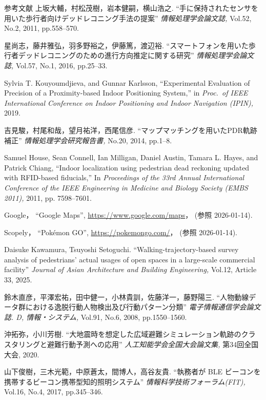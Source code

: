 \begin{thebibliography}{参考文献}
  上坂大輔，村松茂樹，岩本健嗣，横山浩之.
  ``手に保持されたセンサを用いた歩行者向けデッドレコニング手法の提案''
  {\sl 情報処理学会論文誌,}
  Vol.52,
  No.2,
  2011,
  pp.558--570.

  星尚志，藤井雅弘，羽多野裕之，伊藤篤，渡辺裕.
  ``スマートフォンを用いた歩行者デッドレコニングのための進行方向推定に関する研究''
  {\sl 情報処理学会論文誌,}
  Vol.57,
  No.1,
  2016,
  pp.25--33.

  Sylvia T. Kouyoumdjieva, and Gunnar Karlsson,
  ``Experimental Evaluation of Precision of a Proximity-based Indoor Positioning System,''
  in {\sl Proc.\ of IEEE International Conference on Indoor Positioning and Indoor Navigation (IPIN),}
  2019.


  吉見駿，村尾和哉，望月祐洋，西尾信彦.
  ``マップマッチングを用いたPDR軌跡補正''
  {\sl 情報処理学会研究報告書,}
  No.20,
  2014,
  pp.1--8.

  Samuel House, Sean Connell, Ian Milligan, Daniel Austin, Tamara L. Hayes, and Patrick Chiang,
  ``Indoor localization using pedestrian dead reckoning updated with RFID-based fiducials,''
  In {\sl Proceedings of the 33rd Annual International Conference of the IEEE Engineering in Medicine and Biology Society (EMBS 2011),}
  2011,
  pp. 7598--7601.


  Google，
  ``Google Maps'',
  \url{https://www.google.com/maps}，
  (参照 2026-01-14).

  Scopely，
  ``Pokémon GO'',
  \url{https://pokemongo.com/}，
  (参照 2026-01-14).


  Daisuke Kawamura, Tsuyoshi Setoguchi.
  ``Walking-trajectory-based survey analysis of pedestrians’ actual usages of open spaces in a large-scale commercial facility''
  {\sl Journal of Asian Architecture and Building Engineering,}
  Vol.12,
  Article 33,
  2025.

  鈴木直彦，平澤宏祐，田中健一，小林貴訓，佐藤洋一，藤野陽三.
  ``人物動線データ群における逸脱行動人物検出及び行動パターン分類''
  {\sl 電子情報通信学会論文誌. D, 情報・システム,}
  Vol.91,
  No.6,
  2008,
  pp.1550--1560.


  沖拓弥，小川芳樹.
  ``大地震時を想定した広域避難シミュレーション軌跡のクラスタリングと避難行動予測への応用''
  {\sl 人工知能学会全国大会論文集,}
  第34回全国大会,
  2020.

  山下俊樹，三木光範，中原蒼太，間博人，高谷友貴.
  ``執務者が BLE ビーコンを携帯するビーコン携帯型知的照明システム''
  {\sl 情報科学技術フォーラム(FIT),}
  Vol.16,
  No.4,
  2017,
  pp.345--346.


\end{thebibliography}
